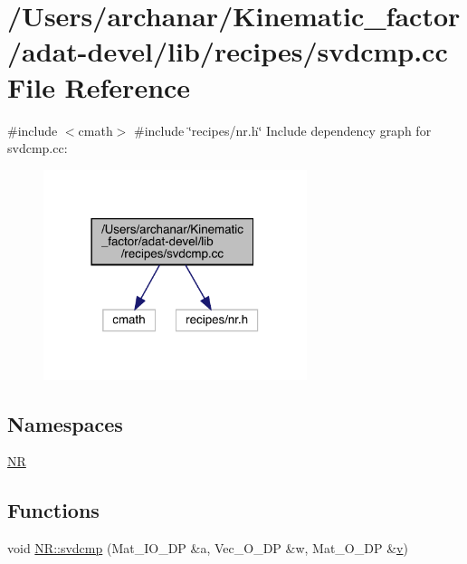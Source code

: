 \hypertarget{adat-devel_2lib_2recipes_2svdcmp_8cc}{}\section{/\+Users/archanar/\+Kinematic\+\_\+factor/adat-\/devel/lib/recipes/svdcmp.cc File Reference}
\label{adat-devel_2lib_2recipes_2svdcmp_8cc}
{\ttfamily \#include $<$cmath$>$}\newline
{\ttfamily \#include \char`\"{}recipes/nr.\+h\char`\"{}}\newline
Include dependency graph for svdcmp.\+cc\+:
\nopagebreak
\begin{figure}[H]
\begin{center}
\leavevmode
\includegraphics[width=218pt]{d7/d73/adat-devel_2lib_2recipes_2svdcmp_8cc__incl}
\end{center}
\end{figure}
\subsection*{Namespaces}
\begin{DoxyCompactItemize}
\item 
 \mbox{\hyperlink{namespaceNR}{NR}}
\end{DoxyCompactItemize}
\subsection*{Functions}
\begin{DoxyCompactItemize}
\item 
void \mbox{\hyperlink{namespaceNR_ad532389e2c426c3c38b860f4fd254103}{N\+R\+::svdcmp}} (Mat\+\_\+\+I\+O\+\_\+\+DP \&a, Vec\+\_\+\+O\+\_\+\+DP \&w, Mat\+\_\+\+O\+\_\+\+DP \&\mbox{\hyperlink{adat__devel_2lib_2hadron_2hadron__timeslice_8cc_a716fc87f5e814be3ceee2405ed6ff22a}{v}})
\end{DoxyCompactItemize}
